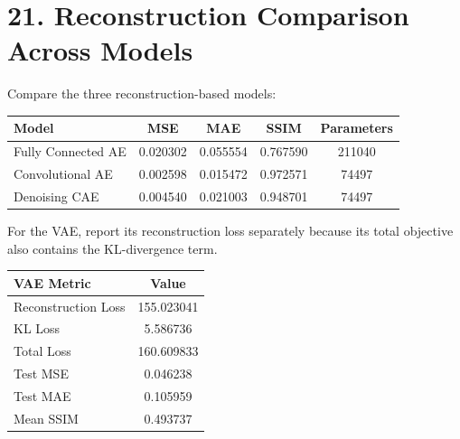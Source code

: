 \documentclass[10pt]{article}
\begin{document}
\section*{21. Reconstruction Comparison Across Models}

Compare the three reconstruction-based models:


\begin{center}
\begin{tabular}{|l|c|c|c|c|}
\hline
Model & MSE & MAE & SSIM & Parameters\\
\hline
Fully Connected AE & 0.020302 & 0.055554 & 0.767590 & 211040\\
Convolutional AE & 0.002598 & 0.015472 & 0.972571 & 74497\\
Denoising CAE & 0.004540 & 0.021003 & 0.948701 & 74497\\
\hline
\end{tabular}
\end{center}


For the VAE, report its reconstruction loss separately because its total
objective also contains the KL-divergence term.


\begin{center}
\begin{tabular}{|l|c|}
\hline
VAE Metric & Value\\
\hline
Reconstruction Loss & 155.023041\\
KL Loss & 5.586736\\
Total Loss & 160.609833\\
Test MSE & 0.046238\\
Test MAE & 0.105959\\
Mean SSIM & 0.493737\\
\hline
\end{tabular}
\end{center}
\end{document}
